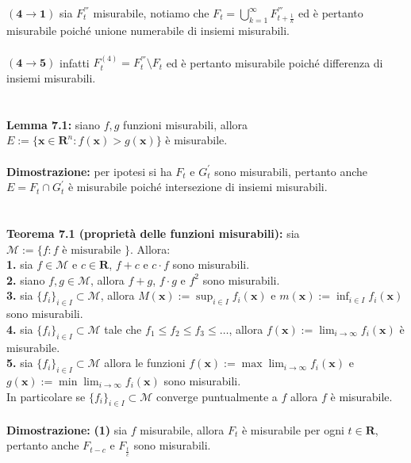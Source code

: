 \documentclass{article}
\begin{document}
$\mathbf{(4 \rightarrow 1)}$ sia $F_t^{'''}$ misurabile, notiamo che $F_t = \bigcup_{k = 1}^\infty F_{t + \frac{1}{k}}^{'''}$ ed è pertanto misurabile poiché unione numerabile di insiemi misurabili. \\ \\
$\mathbf{(4 \rightarrow 5)}$ infatti $F_t^{(4)} = F_t^{'''} \setminus F_t$ ed è pertanto misurabile poiché differenza di insiemi misurabili. \\ \\ \\
\textbf{Lemma 7.1:} siano $f, g$ funzioni misurabili, allora $E := \{ \mathbf{x} \in \mathbf{R}^n : f(\mathbf{x}) > g(\mathbf{x}) \}$ è misurabile. \\ \\
\textbf{Dimostrazione:} per ipotesi si ha $F_t$ e $G_t^{'}$ sono misurabili, pertanto anche $E = F_t \cap G_t^{'}$ è misurabile poiché intersezione di insiemi misurabili. \\ \\ \\
\textbf{Teorema 7.1 (proprietà delle funzioni misurabili):} sia $\mathcal{M} := \{ f : f \text{ è misurabile } \}$. Allora: \\
\textbf{1.} sia $f \in \mathcal{M}$ e $c \in \mathbf{R}$, $f + c$ e $c \cdot f$ sono misurabili. \\
\textbf{2.} siano $f, g \in \mathcal{M}$, allora $f + g$, $f \cdot g$ e $f^2$ sono misurabili. \\
\textbf{3.} sia $\{ f_i \}_{i \in I} \subset \mathcal{M}$, allora $M(\mathbf{x}) := \sup_{i \in I} f_i(\mathbf{x})$ e $m(\mathbf{x}) := \inf_{i \in I} f_i(\mathbf{x})$ sono misurabili. \\
\textbf{4.} sia $\{ f_i \}_{i \in I} \subset \mathcal{M}$ tale che $f_1 \leq f_2 \leq f_3 \leq \dots$, allora $f(\mathbf{x}) := \lim_{i \rightarrow \infty} f_i(\mathbf{x})$ è misurabile. \\
\textbf{5.} sia $\{ f_i \}_{i \in I} \subset \mathcal{M}$ allora le funzioni $f(\mathbf{x}) := \max \lim_{i \rightarrow \infty} f_i(\mathbf{x})$ e $g(\mathbf{x}) := \min \lim_{i \rightarrow \infty} f_i(\mathbf{x})$ sono misurabili. \\
In particolare se $\{ f_i \}_{i \in I} \subset \mathcal{M}$ converge puntualmente a $f$ allora $f$ è misurabile. \\ \\
\textbf{Dimostrazione:} \textbf{(1)} sia $f$ misurabile, allora $F_t$ è misurabile per ogni $t \in \mathbf{R}$, pertanto anche $F_{t - c}$ e $F_{\frac{t}{c}}$ sono misurabili. \\ \\ \\
\end{document}
